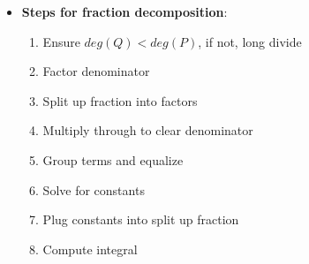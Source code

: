 \documentclass{report}
\begin{document}
\begin{itemize}
        \item \textbf{Steps for fraction decomposition}:
            \begin{enumerate}
                \item Ensure $deg(Q) < deg(P)$, if not, long divide
                \item Factor denominator
                \item Split up fraction into factors
                \item Multiply through to clear denominator
                \item Group terms and equalize
                \item Solve for constants
                \item Plug constants into split up fraction
                \item Compute integral
            \end{enumerate}


\end{itemize}
\end{document}
